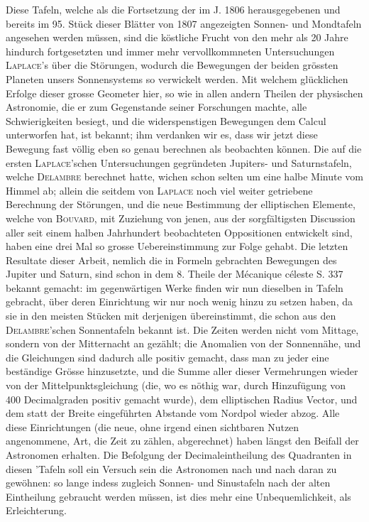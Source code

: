 Diese Tafeln, welche als die Fortsetzung der im J. 1806 herausgegebenen und bereits im 95. Stück dieser Blätter von 1807 angezeigten Sonnen- und Mondtafeln angesehen werden müssen, sind die köstliche Frucht von den mehr als 20 Jahre hindurch fortgesetzten und immer mehr vervollkommneten Untersuchungen \textsc{Laplace}'s über die Störungen, wodurch die Bewegungen der beiden grössten Planeten unsers Sonnensystems so verwickelt werden. Mit welchem glücklichen Erfolge dieser grosse Geometer hier, so wie in allen andern Theilen der physischen Astronomie, die er zum Gegenstande seiner Forschungen machte, alle Schwierigkeiten besiegt, und die widerspenstigen Bewegungen dem Calcul unterworfen hat, ist bekannt; ihm verdanken wir es, dass wir jetzt diese Bewegung fast völlig eben so genau berechnen als beobachten können. Die auf die ersten \textsc{Laplace}'schen Untersuchungen gegründeten Jupiters- und Saturnstafeln, welche \textsc{Delambre} berechnet hatte, wichen schon selten um eine halbe Minute vom Himmel ab; allein die seitdem von \textsc{Laplace} noch viel weiter getriebene Berechnung der Störungen, und die neue Bestimmung der elliptischen Elemente, welche von \textsc{Bouvard}, mit Zuziehung von jenen, aus der sorgfältigsten Discussion aller seit einem halben Jahrhundert beobachteten Oppositionen entwickelt sind, haben eine drei Mal so grosse Uebereinstimmung zur Folge gehabt. Die letzten Resultate dieser Arbeit, nemlich die in Formeln gebrachten Bewegungen des Jupiter und Saturn, sind schon in dem 8. Theile der Mécanique céleste S. 337 bekannt gemacht: im gegenwärtigen Werke finden wir nun dieselben in Tafeln gebracht, über deren Einrichtung wir nur noch wenig hinzu zu setzen haben, da sie in den meisten Stücken mit derjenigen übereinstimmt, die schon aus den \textsc{Delambre}'schen Sonnentafeln bekannt ist. Die Zeiten werden nicht vom Mittage, sondern von der Mitternacht an gezählt; die Anomalien von der Sonnennähe, und die Gleichungen sind dadurch alle positiv gemacht, dass man zu jeder eine beständige Grösse hinzusetzte, und die Summe aller dieser Vermehrungen wieder von der Mittelpunktsgleichung (die, wo es nöthig war, durch Hinzufügung von 400 Decimalgraden positiv gemacht wurde), dem elliptischen Radius Vector, und dem statt der Breite eingeführten Abstande vom Nordpol wieder abzog. Alle diese Einrichtungen (die neue, ohne irgend einen sichtbaren Nutzen angenommene, Art, die Zeit zu zählen, abgerechnet) haben längst den Beifall der Astronomen erhalten. Die Befolgung der Decimaleintheilung des Quadranten in diesen 'Tafeln soll ein Versuch sein die Astronomen nach und nach daran zu gewöhnen: so lange indess zugleich Sonnen- und Sinustafeln nach der alten Eintheilung gebraucht werden müssen, ist dies mehr eine Unbequemlichkeit, als Erleichterung.

